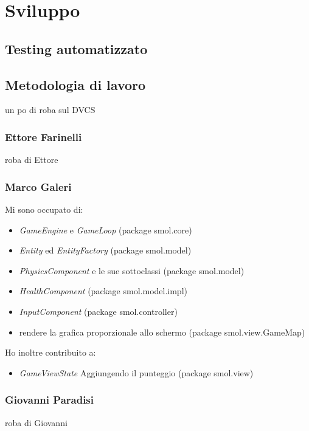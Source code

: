 \documentclass[a4paper,12pt]{report}
\begin{document}
\chapter{Sviluppo}

\section{Testing automatizzato}

\section{Metodologia di lavoro}
un po di roba sul DVCS

\subsection*{Ettore Farinelli}
roba di Ettore
\subsection*{Marco Galeri}

Mi sono occupato di:
\begin{itemize}
    \item \emph{GameEngine} e \emph{GameLoop} (package smol.core)
    \item \emph{Entity} ed \emph{EntityFactory} (package smol.model)
    \item \emph{PhysicsComponent} e le sue sottoclassi (package smol.model)
    \item \emph{HealthComponent} (package smol.model.impl)
    \item \emph{InputComponent} (package smol.controller)
    \item rendere la grafica proporzionale allo schermo (package smol.view.GameMap)
\end{itemize}

Ho inoltre contribuito a:
\begin{itemize}
    \item \emph{GameViewState} Aggiungendo il punteggio (package smol.view)
\end{itemize}

\subsection*{Giovanni Paradisi}
roba di Giovanni
\end{document}
